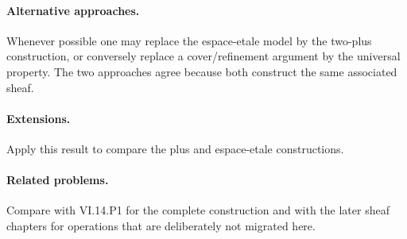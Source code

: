 \paragraph{Alternative approaches.}
Whenever possible one may replace the espace-etale model by the two-plus construction, or conversely replace a cover/refinement argument by the universal property.  The two approaches agree because both construct the same associated sheaf.

\paragraph{Extensions.}
Apply this result to compare the plus and espace-etale constructions.

\paragraph{Related problems.}
Compare with VI.14.P1 for the complete construction and with the later sheaf chapters for operations that are deliberately not migrated here.
\fi
